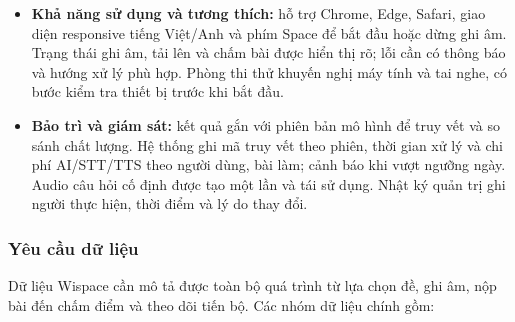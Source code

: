 \begin{itemize}
\item \textbf{Khả năng sử dụng và tương thích:} hỗ trợ Chrome, Edge, Safari, giao diện responsive tiếng Việt/Anh và phím Space để bắt đầu hoặc dừng ghi âm. Trạng thái ghi âm, tải lên và chấm bài được hiển thị rõ; lỗi cần có thông báo và hướng xử lý phù hợp. Phòng thi thử khuyến nghị máy tính và tai nghe, có bước kiểm tra thiết bị trước khi bắt đầu.

\item \textbf{Bảo trì và giám sát:} kết quả gắn với phiên bản mô hình để truy vết và so sánh chất lượng. Hệ thống ghi mã truy vết theo phiên, thời gian xử lý và chi phí AI/STT/TTS theo người dùng, bài làm; cảnh báo khi vượt ngưỡng ngày. Audio câu hỏi cố định được tạo một lần và tái sử dụng. Nhật ký quản trị ghi người thực hiện, thời điểm và lý do thay đổi.
\end{itemize}

\subsubsection{Yêu cầu dữ liệu}
\label{wispace:subsubsec:wispace_data_requirements}
Dữ liệu Wispace cần mô tả được toàn bộ quá trình từ lựa chọn đề, ghi âm, nộp bài đến chấm điểm và theo dõi tiến bộ. Các nhóm dữ liệu chính gồm:

